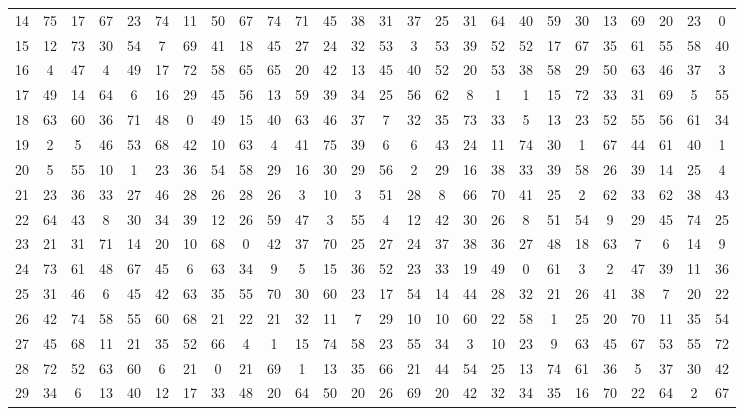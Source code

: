 \begin{table}
\begin{tabular}{c c c c c c c c c c c c c c c c c c c c c c c c c c }
14 & 75 & 17 & 67 & 23 & 74 & 11 & 50 & 67 & 74 & 71 & 45 & 38 & 31 & 37 & 25 & 31 & 64 & 40 & 59 & 30 & 13 & 69 & 20 & 23 & 0 \\
15 & 12 & 73 & 30 & 54 & 7 & 69 & 41 & 18 & 45 & 27 & 24 & 32 & 53 & 3 & 53 & 39 & 52 & 52 & 17 & 67 & 35 & 61 & 55 & 58 & 40 \\
16 & 4 & 47 & 4 & 49 & 17 & 72 & 58 & 65 & 65 & 20 & 42 & 13 & 45 & 40 & 52 & 20 & 53 & 38 & 58 & 29 & 50 & 63 & 46 & 37 & 3 \\
17 & 49 & 14 & 64 & 6 & 16 & 29 & 45 & 56 & 13 & 59 & 39 & 34 & 25 & 56 & 62 & 8 & 1 & 1 & 15 & 72 & 33 & 31 & 69 & 5 & 55 \\
18 & 63 & 60 & 36 & 71 & 48 & 0 & 49 & 15 & 40 & 63 & 46 & 37 & 7 & 32 & 35 & 73 & 33 & 5 & 13 & 23 & 52 & 55 & 56 & 61 & 34 \\
19 & 2 & 5 & 46 & 53 & 68 & 42 & 10 & 63 & 4 & 41 & 75 & 39 & 6 & 6 & 43 & 24 & 11 & 74 & 30 & 1 & 67 & 44 & 61 & 40 & 1 \\
20 & 5 & 55 & 10 & 1 & 23 & 36 & 54 & 58 & 29 & 16 & 30 & 29 & 56 & 2 & 29 & 16 & 38 & 33 & 39 & 58 & 26 & 39 & 14 & 25 & 4 \\
21 & 23 & 36 & 33 & 27 & 46 & 28 & 26 & 28 & 26 & 3 & 10 & 3 & 51 & 28 & 8 & 66 & 70 & 41 & 25 & 2 & 62 & 33 & 62 & 38 & 43 \\
22 & 64 & 43 & 8 & 30 & 34 & 39 & 12 & 26 & 59 & 47 & 3 & 55 & 4 & 12 & 42 & 30 & 26 & 8 & 51 & 54 & 9 & 29 & 45 & 74 & 25 \\
23 & 21 & 31 & 71 & 14 & 20 & 10 & 68 & 0 & 42 & 37 & 70 & 25 & 27 & 24 & 37 & 38 & 36 & 27 & 48 & 18 & 63 & 7 & 6 & 14 & 9 \\
24 & 73 & 61 & 48 & 67 & 45 & 6 & 63 & 34 & 9 & 5 & 15 & 36 & 52 & 23 & 33 & 19 & 49 & 0 & 61 & 3 & 2 & 47 & 39 & 11 & 36 \\
25 & 31 & 46 & 6 & 45 & 42 & 63 & 35 & 55 & 70 & 30 & 60 & 23 & 17 & 54 & 14 & 44 & 28 & 32 & 21 & 26 & 41 & 38 & 7 & 20 & 22 \\
26 & 42 & 74 & 58 & 55 & 60 & 68 & 21 & 22 & 21 & 32 & 11 & 7 & 29 & 10 & 10 & 60 & 22 & 58 & 1 & 25 & 20 & 70 & 11 & 35 & 54 \\
27 & 45 & 68 & 11 & 21 & 35 & 52 & 66 & 4 & 1 & 15 & 74 & 58 & 23 & 55 & 34 & 3 & 10 & 23 & 9 & 63 & 45 & 67 & 53 & 55 & 72 \\
28 & 72 & 52 & 63 & 60 & 6 & 21 & 0 & 21 & 69 & 1 & 13 & 35 & 66 & 21 & 44 & 54 & 25 & 13 & 74 & 61 & 36 & 5 & 37 & 30 & 42 \\
29 & 34 & 6 & 13 & 40 & 12 & 17 & 33 & 48 & 20 & 64 & 50 & 20 & 26 & 69 & 20 & 42 & 32 & 34 & 35 & 16 & 70 & 22 & 64 & 2 & 67 \\

\end{tabular}
\end{table}
